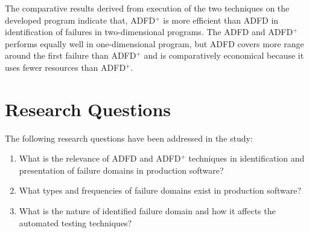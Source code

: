 The comparative results derived from execution of the two techniques on the developed program indicate that, ADFD$^+$ is more efficient than ADFD in identification of failures in two-dimensional programs. The ADFD and ADFD$^+$ performs equally well in one-dimensional program, but ADFD covers more range around the first failure than ADFD$^+$ and is comparatively economical because it uses fewer resources than ADFD$^+$.


\section{Research Questions} \label{sec:questions}
The following research questions have been addressed in the study:
\begin{enumerate}
%
\item What is the relevance of ADFD and ADFD$^+$ techniques in identification and presentation of failure domains in production software? %

%
%
\item What types and frequencies of failure domains exist in production software? %
%
\item What is the nature of identified failure domain and how it affects the automated testing techniques? %


\end{enumerate}
